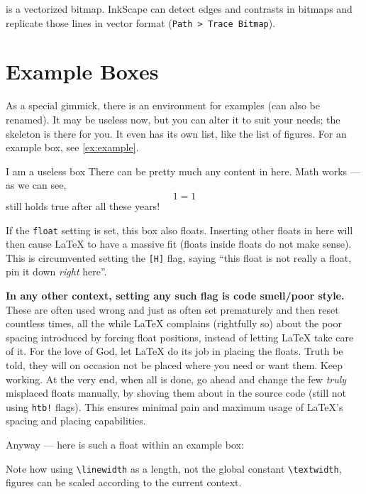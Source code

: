  is a vectorized bitmap.
InkScape can detect edges and contrasts in bitmaps and replicate those lines in
vector format (\texttt{Path > Trace Bitmap}).

\section{Example Boxes}

As a special gimmick, there is an environment for examples (can also be renamed).
It may be useless now, but you can alter it to suit your needs; the skeleton is
there for you.
It even has its own list, like the list of figures.
For an example box, see \cref{ex:example}.

\begin{example}[%
        label={ex:example},%
    ]{%
        I am a useless box%
    }
    There can be pretty much any content in here.
    Math works --- as we can see,
    \begin{equation}
        1 = 1
    \end{equation}
    still holds true after all these years!
    
    If the \verb|float| setting is set, this box also floats.
    Inserting other floats in here will then cause \LaTeX{} to have a massive fit
    (floats inside floats do not make sense).
    This is circumvented setting the \verb|[H]| flag,
    saying \enquote{this float is not really a float, pin it down \emph{right} here}.
    
    \textbf{In any other context, setting any such flag is code smell/poor style.}
    These are often used wrong and just as often set prematurely and then reset
    countless times, all the while \LaTeX{} complains (rightfully so) about the poor
    spacing introduced by forcing float positions, instead of letting \LaTeX{} take
    care of it.
    For the love of God, let \LaTeX{} do its job in placing the floats.
    Truth be told, they will on occasion not be placed where you need or want them.
    Keep working.
    At the very end, when all is done, go ahead and change the few \emph{truly}
    misplaced floats manually, by shoving them about in the source code
    (still not using \verb|htb!| flags).
    This ensures minimal pain and maximum usage of \LaTeX{}'s spacing and placing
    capabilities.
    
    Anyway --- here is such a float within an example box:
    \begin{center}
        \begin{minipage}[t]{0.4\linewidth}
            \label{fig:inside_float}
        \end{minipage}
        \hfill
        \begin{minipage}[t]{0.55\linewidth}
            
        \end{minipage}
    \end{center}
    Note how using \verb|\linewidth| as a length, not the global constant
    \verb|\textwidth|, figures can be scaled according to the current context.
    

\end{example}
